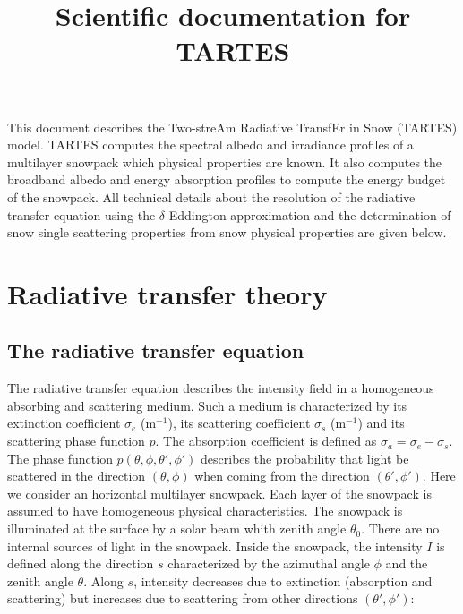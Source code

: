 \documentclass[a4paper,11pt]{article}
\begin{document}
\title{Scientific documentation for TARTES}
\date{}
\maketitle

This document describes the Two-streAm Radiative TransfEr in Snow (TARTES) model. TARTES computes the spectral albedo and irradiance profiles of a multilayer snowpack which physical properties are known. It also computes the broadband albedo and energy absorption profiles to compute the energy budget of the snowpack. All technical details about the resolution of the radiative transfer equation using the $\delta$-Eddington approximation and the determination of snow single scattering properties from snow physical properties are given below.

\tableofcontents

\section{Radiative transfer theory}
\subsection{The radiative transfer equation}



The radiative transfer equation \citep[e.g.][]{chandrasekhar_radiative_1960} describes the intensity field in a homogeneous absorbing and scattering medium. Such a medium is characterized by its extinction coefficient $\sigma_e$ (m$^{-1}$), its scattering coefficient $\sigma_s$ (m$^{-1}$) and its scattering phase function $p$. The absorption coefficient is defined as $\sigma_a=\sigma_e-\sigma_s$. The phase function $p(\theta,\phi,\theta',\phi')$ describes the probability that light be scattered in the direction $(\theta,\phi)$ when coming from the direction $(\theta',\phi')$. Here we consider an horizontal multilayer snowpack. Each layer of the snowpack is assumed to have homogeneous physical characteristics. The snowpack is illuminated at the surface by a solar beam whith zenith angle $\theta_0$. There are no internal sources of light in the snowpack. Inside the snowpack, the intensity $I$ is defined along the direction $s$ characterized by the azimuthal angle $\phi$ and the zenith angle $\theta$. Along $s$, intensity decreases due to extinction (absorption and scattering) but increases due to scattering from other directions $(\theta',\phi')$:
\end{document}
